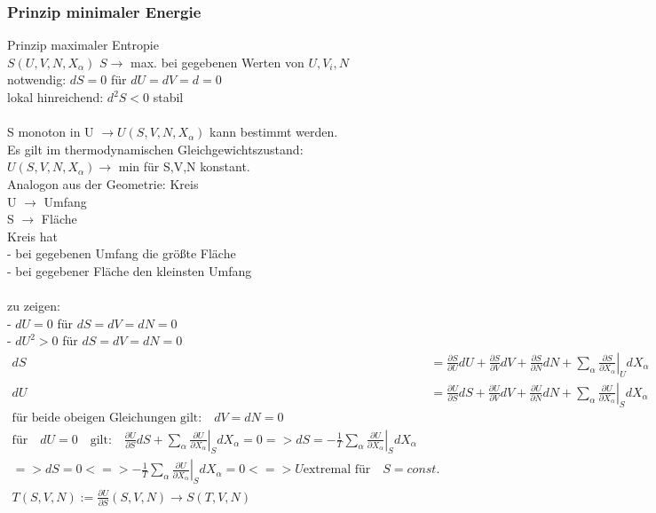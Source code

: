 \documentclass[10pt]{scrartcl}
\begin{document}
\begin{fleqn}
\subsubsection{Prinzip minimaler Energie}
Prinzip maximaler Entropie\\
$S(U,V,N,X_\alpha)$ $S\rightarrow$ max. bei gegebenen Werten von $U,V_i,N$\\
notwendig: $dS=0$ für $dU=dV=d=0$\\
lokal hinreichend: $d^2S<0$ stabil\\ \\
S monoton in U $\rightarrow U(S,V,N,X_\alpha)$ kann bestimmt werden.\\
Es gilt im thermodynamischen Gleichgewichtszustand:\\
$U(S,V,N,X_\alpha) \rightarrow$ min für S,V,N konstant.\\
Analogon aus der Geometrie: Kreis\\
U $\rightarrow$ Umfang\\
S $\rightarrow$ Fläche\\
Kreis hat\\
- bei gegebenen Umfang die größte Fläche\\
- bei gegebener Fläche den kleinsten Umfang\\ \\
zu zeigen:\\
- $dU=0$ für $dS=dV=dN=0$\\
- $dU^2 > 0$ für $dS=dV=dN=0$
\begin{equation}
\begin{aligned}
dS&=\frac{\partial S}{\partial U}dU+\frac{\partial S}{\partial V}dV+\frac{\partial S}{\partial N}dN+\left.\sum_\alpha\frac{\partial S}{\partial X_\alpha}\right|_UdX_\alpha\\
dU&=\frac{\partial U}{\partial S}dS+\frac{\partial U}{\partial V}dV+\frac{\partial U}{\partial N}dN+\left.\sum_\alpha\frac{\partial U}{\partial X_\alpha}\right|_SdX_\alpha\\
\text{für beide obeigen Gleichungen gilt:}\quad dV=dN=0\\
\text{für} \quad dU=0 \quad \text{gilt:} \quad \frac{\partial U}{\partial S}dS + \left.\sum_\alpha\frac{\partial U}{\partial X_\alpha}\right|_SdX_\alpha = 0
  => dS = -\frac{1}{T} \left.\sum_\alpha\frac{\partial U}{\partial X_\alpha}\right|_SdX_\alpha \\
=> dS = 0 <=> -\frac{1}{T} \left.\sum_\alpha\frac{\partial U}{\partial X_\alpha}\right|_SdX_\alpha = 0 <=> U \text{extremal für} \quad S=const. \\ 
T(S,V,N) := \frac{\partial U}{\partial S}(S,V,N) \rightarrow S(T,V,N)
\end{aligned}
\end{equation}
\end{fleqn}
\end{document}
